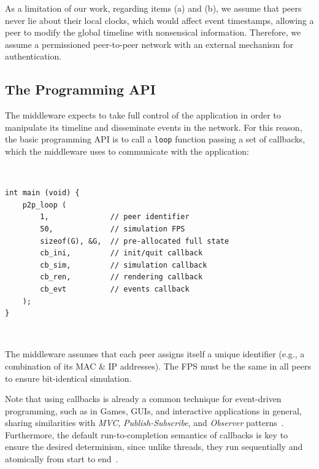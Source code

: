 \documentclass[10pt,journal,compsoc]{IEEEtran}
\newcommand{\code}[1]  {\texttt{\small{#1}}}
\begin{document}
As a limitation of our work, regarding items (a) and (b), we assume that peers
never lie about their local clocks, which would affect event timestamps,
allowing a peer to modify the global timeline with nonsensical information.
%
Therefore, we assume a permissioned peer-to-peer network with an external
mechanism for authentication.

\subsection{The Programming API}
\label{sec.tml.api}

The middleware expects to take full control of the application in order to
manipulate its timeline and disseminate events in the network.
For this reason, the basic programming API is to call a \code{loop} function
passing a set of callbacks, which the middleware uses to communicate with the
application:

{\footnotesize
~
\begin{verbatim}
int main (void) {
    p2p_loop (
        1,              // peer identifier
        50,             // simulation FPS
        sizeof(G), &G,  // pre-allocated full state
        cb_ini,         // init/quit callback
        cb_sim,         // simulation callback
        cb_ren,         // rendering callback
        cb_evt          // events callback
    );
}
\end{verbatim}
~
}

The middleware assumes that each peer assigns itself a unique identifier (e.g.,
a combination of its MAC \& IP addresses).
The FPS must be the same in all peers to ensure bit-identical simulation.

Note that using callbacks is already a common technique for event-driven
programming, such as in Games, GUIs, and interactive applications in general,
sharing similarities with \emph{MVC}, \emph{Publish-Subscribe}, and
\emph{Observer} patterns~\cite{meyer,nystrom}.
%
Furthermore, the default run-to-completion semantics of callbacks is key to
ensure the desired determinism, since unlike threads, they run sequentially and
atomically from start to end~\cite{events,threads}.

\end{document}
